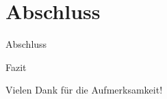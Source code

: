 \documentclass[aspectratio=1610]{beamer}
\begin{document}
\section{Abschluss}
\label{sec:org5ca0d87}
\begin{frame}[label={sec:org25531ec}]{Abschluss}
\begin{block}{Fazit}
\end{block}
\end{frame}

\begin{frame}[label={sec:org7a268b1}]{}
\alert{\huge{Vielen Dank für die Aufmerksamkeit!}}
\end{frame}
\end{document}
